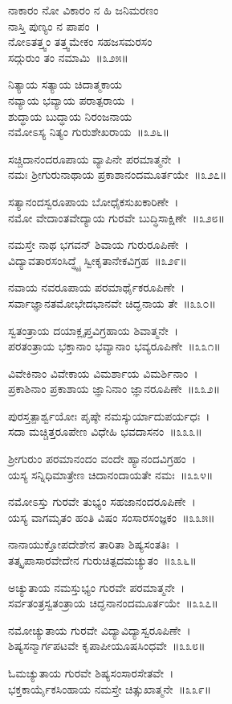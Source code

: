 ನಾಕಾರಂ ನೋ ವಿಕಾರಂ ನ ಹಿ ಜನಿಮರಣಂ \\ನಾಸ್ತಿ ಪುಣ್ಯಂ ನ ಪಾಪಂ~।\\
ನೋಽತತ್ತ್ವಂ ತತ್ತ್ವಮೇಕಂ ಸಹಜಸಮರಸಂ \\ಸದ್ಗುರುಂ ತಂ ನಮಾಮಿ~॥೩೨೫॥

ನಿತ್ಯಾಯ ಸತ್ಯಾಯ ಚಿದಾತ್ಮಕಾಯ \\ನವ್ಯಾಯ ಭವ್ಯಾಯ ಪರಾತ್ಪರಾಯ~।\\
ಶುದ್ಧಾಯ ಬುದ್ಧಾಯ ನಿರಂಜನಾಯ\\ ನಮೋಽಸ್ಯ ನಿತ್ಯಂ ಗುರುಶೇಖರಾಯ~॥೩೨೬॥

ಸಚ್ಚಿದಾನಂದರೂಪಾಯ ವ್ಯಾಪಿನೇ ಪರಮಾತ್ಮನೇ~।\\
ನಮಃ ಶ್ರೀಗುರುನಾಥಾಯ ಪ್ರಕಾಶಾನಂದಮೂರ್ತಯೇ~॥೩೨೭॥

ಸತ್ಯಾನಂದಸ್ವರೂಪಾಯ ಬೋಧೈಕಸುಖಕಾರಿಣೇ~।\\
ನಮೋ ವೇದಾಂತವೇದ್ಯಾಯ ಗುರವೇ ಬುದ್ಧಿಸಾಕ್ಷಿಣೇ~॥೩೨೮॥

ನಮಸ್ತೇ ನಾಥ ಭಗವನ್ ಶಿವಾಯ ಗುರುರೂಪಿಣೇ~।\\
ವಿದ್ಯಾವತಾರಸಂಸಿದ್ಧ್ಯೈ ಸ್ವೀಕೃತಾನೇಕವಿಗ್ರಹ~॥೩೨೯॥

ನವಾಯ ನವರೂಪಾಯ ಪರಮಾರ್ಥೈಕರೂಪಿಣೇ~।\\
ಸರ್ವಾಜ್ಞಾನತಮೋಭೇದಭಾನವೇ ಚಿದ್ಘನಾಯ ತೇ~॥೩೩೦॥

ಸ್ವತಂತ್ರಾಯ ದಯಾಕ್ಲೃಪ್ತವಿಗ್ರಹಾಯ ಶಿವಾತ್ಮನೇ~।\\
ಪರತಂತ್ರಾಯ ಭಕ್ತಾನಾಂ ಭವ್ಯಾನಾಂ ಭವ್ಯರೂಪಿಣೇ~॥೩೩೧॥

ವಿವೇಕಿನಾಂ ವಿವೇಕಾಯ ವಿಮರ್ಶಾಯ ವಿಮರ್ಶಿನಾಂ~।\\
ಪ್ರಕಾಶಿನಾಂ ಪ್ರಕಾಶಾಯ ಜ್ಞಾನಿನಾಂ ಜ್ಞಾನರೂಪಿಣೇ~॥೩೩೨॥

ಪುರಸ್ತತ್ಪಾರ್ಶ್ವಯೋಃ ಪೃಷ್ಠೇ ನಮಸ್ಕುರ್ಯಾದುಪರ್ಯಧಃ~।\\
ಸದಾ ಮಚ್ಚಿತ್ತರೂಪೇಣ ವಿಧೇಹಿ ಭವದಾಸನಂ~॥೩೩೩॥

ಶ್ರೀಗುರುಂ ಪರಮಾನಂದಂ ವಂದೇ ಹ್ಯಾನಂದವಿಗ್ರಹಂ~।\\
ಯಸ್ಯ ಸನ್ನಿಧಿಮಾತ್ರೇಣ ಚಿದಾನಂದಾಯತೇ ನಮಃ~॥೩೩೪॥

ನಮೋಽಸ್ತು ಗುರವೇ ತುಭ್ಯಂ ಸಹಜಾನಂದರೂಪಿಣೇ~।\\
ಯಸ್ಯ ವಾಗಮೃತಂ ಹಂತಿ ವಿಷಂ ಸಂಸಾರಸಂಜ್ಞಕಂ~॥೩೩೫॥

ನಾನಾಯುಕ್ತೋಪದೇಶೇನ ತಾರಿತಾ ಶಿಷ್ಯಸಂತತಿಃ~।\\
ತತ್ಕೃಪಾಸಾರವೇದೇನ ಗುರುಚಿತ್ಪದಮಚ್ಯುತಂ~॥೩೩೬॥

ಅಚ್ಯುತಾಯ ನಮಸ್ತುಭ್ಯಂ ಗುರವೇ ಪರಮಾತ್ಮನೇ~।\\
ಸರ್ವತಂತ್ರಸ್ವತಂತ್ರಾಯ ಚಿದ್ಘನಾನಂದಮೂರ್ತಯೇ~॥೩೩೭॥

ನಮೋಚ್ಯುತಾಯ ಗುರವೇ ವಿದ್ಯಾವಿದ್ಯಾಸ್ವರೂಪಿಣೇ~।\\
ಶಿಷ್ಯಸನ್ಮಾರ್ಗಪಟವೇ ಕೃಪಾಪೀಯೂಷಸಿಂಧವೇ~॥೩೩೮॥

ಓಮಚ್ಯುತಾಯ ಗುರವೇ ಶಿಷ್ಯಸಂಸಾರಸೇತವೇ~।\\
ಭಕ್ತಕಾರ್ಯೈಕಸಿಂಹಾಯ ನಮಸ್ತೇ ಚಿತ್ಸುಖಾತ್ಮನೇ~॥೩೩೯॥

